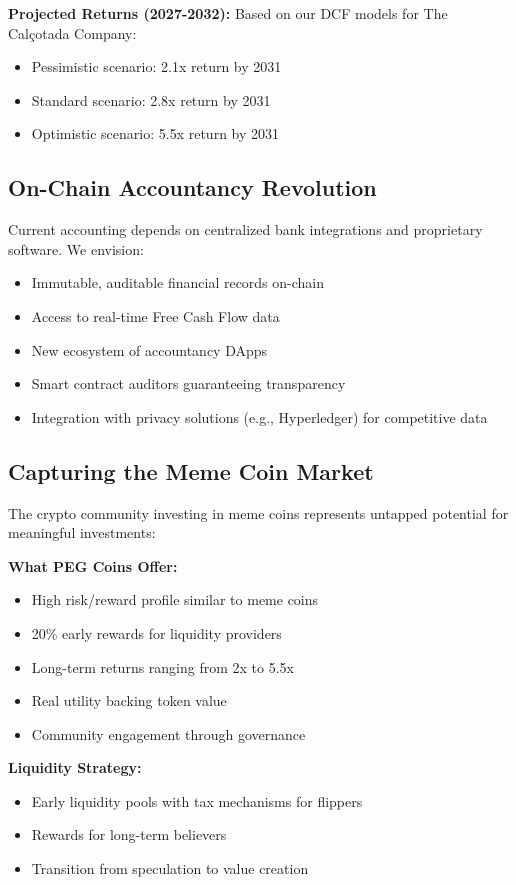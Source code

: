 \documentclass[conference]{IEEEtran}
\begin{document}
\textbf{Projected Returns (2027-2032):}
Based on our DCF models for The Calçotada Company:
\begin{itemize}
    \item Pessimistic scenario: 2.1x return by 2031
    \item Standard scenario: 2.8x return by 2031
    \item Optimistic scenario: 5.5x return by 2031
\end{itemize}

\subsection{On-Chain Accountancy Revolution}

Current accounting depends on centralized bank integrations and proprietary software. We envision:
\begin{itemize}
    \item Immutable, auditable financial records on-chain
    \item Access to real-time Free Cash Flow data
    \item New ecosystem of accountancy DApps
    \item Smart contract auditors guaranteeing transparency
    \item Integration with privacy solutions (e.g., Hyperledger) for competitive data
\end{itemize}

\subsection{Capturing the Meme Coin Market}

The crypto community investing in meme coins represents untapped potential for meaningful investments:

\textbf{What PEG Coins Offer:}
\begin{itemize}
    \item High risk/reward profile similar to meme coins
    \item 20\% early rewards for liquidity providers
    \item Long-term returns ranging from 2x to 5.5x
    \item Real utility backing token value
    \item Community engagement through governance
\end{itemize}

\textbf{Liquidity Strategy:}
\begin{itemize}
    \item Early liquidity pools with tax mechanisms for flippers
    \item Rewards for long-term believers
    \item Transition from speculation to value creation
\end{itemize}
\end{document}

